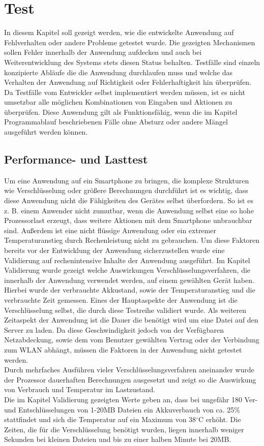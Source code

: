 \documentclass[10pt, a4paper,headsepline]{scrreprt}
\begin{document}
\chapter{Test}
In diesem Kapitel soll gezeigt werden, wie die entwickelte Anwendung auf Fehlverhalten oder andere Probleme getestet wurde. Die gezeigten Mechanismen sollen Fehler innerhalb der Anwendung aufdecken und auch bei Weiterentwicklung des Systems stets diesen Status behalten. Testfälle sind einzeln konzipierte Abläufe die die Anwendung durchlaufen muss und welche das Verhalten der Anwendung auf Richtigkeit oder Fehlerhaftigkeit hin überprüfen. Da Testfälle vom Entwickler selbst implementiert werden müssen, ist es nicht umsetzbar alle möglichen Kombinationen von Eingaben und Aktionen zu überprüfen. Diese Anwendung gilt als Funktionsfähig, wenn die im Kapitel Programmablauf beschriebenen Fälle ohne Absturz oder andere Mängel ausgeführt werden können.


\section{Performance- und Lasttest}
Um eine Anwendung auf ein Smartphone zu bringen, die komplexe Strukturen wie Verschlüsselung oder größere Berechnungen durchführt ist es wichtig, dass diese Anwendung nicht die Fähigkeiten des Gerätes selbst überfordern. So ist es z. B. einem Anwender nicht zumutbar, wenn die Anwendung selbst eine so hohe Prozessorlast erzeugt, dass weitere Aktionen mit dem Smartphone unbrauchbar sind. Außerdem ist eine nicht flüssige Anwendung oder ein extremer Temperaturanstieg durch Rechenleistung nicht zu gebrauchen. Um diese Faktoren bereits vor der Entwicklung der Anwendung sicherzustellen wurde eine Validierung auf rechenintensive Inhalte der Anwendung ausgeführt. Im Kapitel Validierung wurde gezeigt welche Auswirkungen Verschlüsselungsverfahren, die innerhalb der Anwendung verwendet werden, auf einem gewählten Gerät haben. Hierbei wurde der verbrauchte Akkustand, sowie der Temperaturanstieg und die verbrauchte Zeit gemessen. Eines der Hauptaspekte der Anwendung ist die Verschlüsselung selbst, die durch diese Testreihe validiert wurde. Als weiteren Zeitaspekt der Anwendung ist die Dauer die benötigt wird um eine Datei auf den Server zu laden. Da diese Geschwindigkeit jedoch von der Verfügbaren Netzabdeckung, sowie dem vom Benutzer gewählten Vertrag oder der Verbindung zum WLAN abhängt,  müssen die Faktoren in der Anwendung nicht getestet werden. \\
Durch mehrfaches Ausführen vieler Verschlüsselungsverfahren aneinander wurde der Prozessor dauerhaften Berechnungen ausgesetzt und zeigt so die Auswirkung von Verbrauch und Temperatur im Lastzustand. \\
Die im Kapitel Validierung gezeigten Werte geben an, dass bei ungefähr 180 Ver- und Entschlüsselungen von 1-20MB Dateien ein Akkuverbauch von ca. 25\% stattfindet und sich die Temperatur auf ein Maximum von 38$^\circ$C erhöht. Die Zeiten, die für die Verschlüsselung benötigt wurden, liegen innerhalb weniger Sekunden bei kleinen Dateien und bis zu einer halben Minute bei 20MB. 
\end{document}
